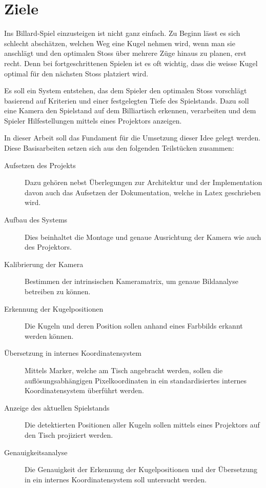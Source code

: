 \chapter{Ziele}
Ins Billard-Spiel einzusteigen ist nicht ganz einfach. Zu Beginn lässt es sich schlecht abschätzen,
welchen Weg eine Kugel nehmen wird, wenn man sie anschlägt und den optimalen Stoss über mehrere Züge hinaus zu planen,
erst recht. Denn bei fortgeschrittenen Spielen ist es oft wichtig, dass die weisse Kugel optimal für den nächsten Stoss
platziert wird.

Es soll ein System entstehen, das dem Spieler den optimalen Stoss vorschlägt basierend auf Kriterien und
einer festgelegten Tiefe des Spielstands. Dazu soll eine Kamera den Spielstand auf dem Billiartisch erkennen, verarbeiten und
dem Spieler Hilfestellungen mittels eines Projektors anzeigen.

In dieser Arbeit soll das Fundament für die Umsetzung dieser Idee gelegt werden. Diese Basisarbeiten setzen sich aus den folgenden
Teilstücken zusammen:
\begin{description}
    \item[Aufsetzen des Projekts] Dazu gehören nebst Überlegungen zur Architektur und der Implementation davon auch
    das Aufsetzen der Dokumentation, welche in Latex geschrieben wird.
    \item[Aufbau des Systems] Dies beinhaltet die Montage und genaue Ausrichtung der Kamera wie auch des Projektors.
    \item[Kalibrierung der Kamera] Bestimmen der intrinsischen Kameramatrix, um genaue Bildanalyse betreiben zu können.
    \item[Erkennung der Kugelpositionen] Die Kugeln und deren Position sollen anhand eines Farbbilds erkannt werden können.
    \item[Übersetzung in internes Koordinatensystem] Mittels Marker, welche am Tisch angebracht werden, sollen die
    auflösungsabhängigen Pixelkoordinaten in ein standardisiertes internes Koordinatensystem überführt werden.
    \item[Anzeige des aktuellen Spielstands] Die detektierten Positionen aller Kugeln sollen mittels eines Projektors
    auf den Tisch projiziert werden.
    \item[Genauigkeitsanalyse] Die Genauigkeit der Erkennung der Kugelpositionen und der Übersetzung in ein
    internes Koordinatensystem soll untersucht werden.
\end{description}

